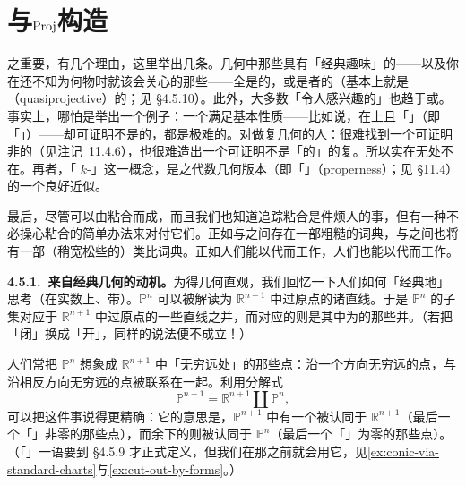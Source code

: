 
\section{\trProjectiveScheme{}与$\operatorname{Proj}$构造}

\trProjectiveScheme{}之重要，有几个理由，这里举出几条。几何中那些具有「经典趣味」的\trScheme——以及你在还不知\trScheme{}为何物时就该会关心的那些\trScheme——全是\trProjective{}的，或是\trProjective{}者的\trOpenSubset（基本上就是\emph{\trQuasiprojective}（quasiprojective）的；见 \S4.5.10）。此外，大多数「令人感兴趣的\trScheme」也趋于\trProjective{}或\trQuasiprojective。事实上，哪怕是举出一个例子：一个满足基本性质——比如说，在\trField{}上\trFiniteType{}且「\trHausdorff」（即「\trSeparated」）——却可证明不是\trQuasiprojective{}的\trScheme，都是极难的。对做复几何的人：很难找到一个可证明非\trProjective{}的\trCompact\trComplex\trVariety（见\mbox{注记~11.4.6}），也很难造出一个可证明不是「\trProjective\trVariety{}的\trOpenSubset」的复\trVariety。所以\trProjectiveScheme{}实在无处不在。再者，「\trProjective{} $k$-\trScheme」这一概念，是\trCompactness{}之代数几何版本（即「\trProperness{}」（properness）；见 \S11.4）的一个良好近似。

最后，尽管\trProjectiveScheme{}可以由\trAffineScheme{}粘合而成，而且我们也知道追踪粘合是件烦人的事，但有一种不必操心粘合的简单办法来对付它们。正如\trRing{}与\trAffineScheme{}之间存在一部粗糙的词典，\trGradedRing{}与\trProjectiveScheme{}之间也将有一部（稍宽松些的）类比词典。正如人们能以\trRing{}代\trAffineScheme{}而工作，人们也能以\trGradedRing{}代\trProjectiveScheme{}而工作。

\textbf{4.5.1.\ 来自经典几何的动机。}\quad 为得几何直观，我们回忆一下人们如何「经典地」思考\trProjectiveSpace（在实数上、带\trClassicalTopology）。$\mathbb{P}^n$ 可以被解读为 $\mathbb{R}^{n+1}$ 中过原点的诸直线。于是 $\mathbb{P}^n$ 的子集对应于 $\mathbb{R}^{n+1}$ 中过原点的一些直线之并，而\trClosedSubset{}对应的则是其中为\trClosedSet{}的那些并。（若把「闭」换成「开」，同样的说法便不成立！）

人们常把 $\mathbb{P}^n$ 想象成 $\mathbb{R}^{n+1}$ 中「无穷远处」的那些点：沿一个方向无穷远的点，与沿相反方向无穷远的点被联系在一起。利用分解式
\[
\mathbb{P}^{n+1}=\mathbb{R}^{n+1}\amalg\mathbb{P}^n,
\]
可以把这件事说得更精确：它的意思是，$\mathbb{P}^{n+1}$ 中有一个\trOpenSubset{}被认同于 $\mathbb{R}^{n+1}$（最后一个「\trProjective\trCoordinate」非零的那些点），而余下的\trClosedSubset{}则被认同于 $\mathbb{P}^n$（最后一个「\trProjective\trCoordinate」为零的那些点）。（「\trProjective\trCoordinate」一语要到 \S4.5.9 才正式定义，但我们在那之前就会用它，见\cref{ex:conic-via-standard-charts}与\cref{ex:cut-out-by-forms}。）

